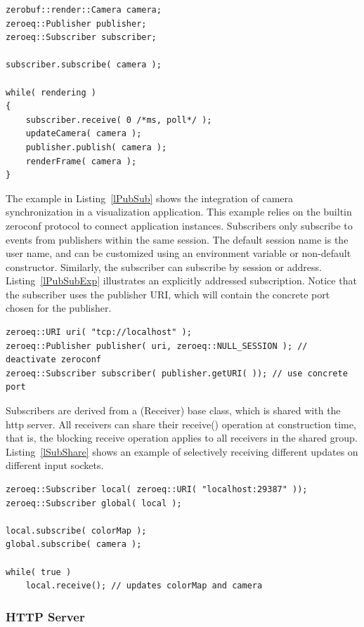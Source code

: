 \documentclass[10pt]{llncs}
\newcommand{\lref}[1]{Listing~\ref{#1}}
\begin{document}
\begin{lstlisting}[float, caption=Publish-Subscribe Example, label=lPubSub]
zerobuf::render::Camera camera;
zeroeq::Publisher publisher;
zeroeq::Subscriber subscriber;

subscriber.subscribe( camera );

while( rendering )
{
    subscriber.receive( 0 /*ms, poll*/ );
    updateCamera( camera );
    publisher.publish( camera );
    renderFrame( camera );
}
\end{lstlisting}

The example in \lref{lPubSub} shows the integration of camera
synchronization in a visualization application. This example relies on the
builtin zeroconf protocol to connect application instances. Subscribers only
subscribe to events from publishers within the same session. The default
session name is the user name, and can be customized using an environment
variable or non-default constructor. Similarly, the subscriber can subscribe by
session or address. \lref{lPubSubExp} illustrates an explicitly addressed
subscription. Notice that the subscriber uses the publisher URI, which will
contain the concrete port chosen for the publisher.

\begin{lstlisting}[float, caption=Explicit Addressing,label=lPubSubExp]
zeroeq::URI uri( "tcp://localhost" );
zeroeq::Publisher publisher( uri, zeroeq::NULL_SESSION ); // deactivate zeroconf
zeroeq::Subscriber subscriber( publisher.getURI( )); // use concrete port
\end{lstlisting}

Subscribers are derived from a \textsf(Receiver) base class, which is shared
with the http server. All receivers can share their \textsf{receive()}
operation at construction time, that is, the blocking receive operation applies
to all receivers in the shared group. \lref{lSubShare} shows an example of
selectively receiving different updates on different input sockets.

\begin{lstlisting}[float,caption=Subscriber Sharing, label=lSubShare]
zeroeq::Subscriber local( zeroeq::URI( "localhost:29387" ));
zeroeq::Subscriber global( local );

local.subscribe( colorMap );
global.subscribe( camera );

while( true )
    local.receive(); // updates colorMap and camera
\end{lstlisting}

\subsubsection{HTTP Server}
\end{document}
